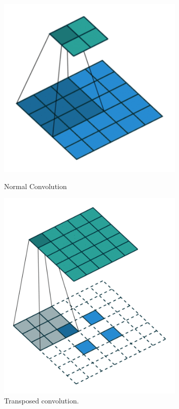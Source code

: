 \documentclass{article}
\begin{document}
\begin{figure}[htbp]
    \centering
    \begin{minipage}{0.45\textwidth}
        \centering
        \includegraphics[width=0.8\textwidth]{normal.png} %
        \caption{Normal Convolution}
    \end{minipage}\hfill
    \begin{minipage}{0.45\textwidth}
        \centering
        \includegraphics[width=0.8\textwidth]{transposed.png} %
        \caption{Transposed convolution.}
    \end{minipage}
\end{figure}
\end{document}
